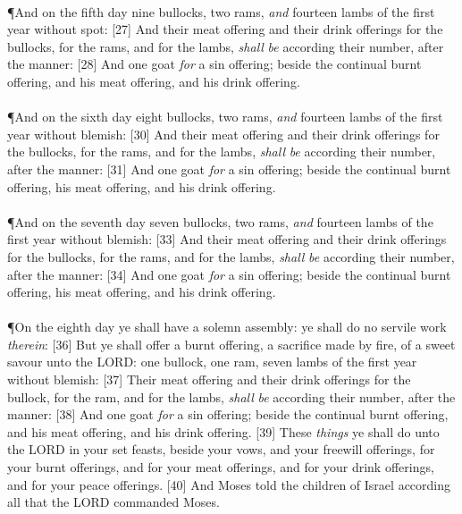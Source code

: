 \\
\P \textcolor[cmyk]{0.99998,1,0,0}{And on the fifth day nine bullocks, two rams, \emph{and} fourteen lambs of the first year without spot:}
[27] \textcolor[cmyk]{0.99998,1,0,0}{And their meat offering and their drink offerings for the bullocks, for the rams, and for the lambs, \emph{shall} \emph{be} according  their number, after the manner:}
[28] \textcolor[cmyk]{0.99998,1,0,0}{And one goat \emph{for} a sin offering; beside the continual burnt offering, and his meat offering, and his drink offering.}\\
\\
\P \textcolor[cmyk]{0.99998,1,0,0}{And on the sixth day eight bullocks, two rams, \emph{and} fourteen lambs of the first year without blemish:}
[30] \textcolor[cmyk]{0.99998,1,0,0}{And their meat offering and their drink offerings for the bullocks, for the rams, and for the lambs, \emph{shall} \emph{be} according  their number, after the manner:}
[31] \textcolor[cmyk]{0.99998,1,0,0}{And one goat \emph{for} a sin offering; beside the continual burnt offering, his meat offering, and his drink offering.}\\
\\
\P \textcolor[cmyk]{0.99998,1,0,0}{And on the seventh day seven bullocks, two rams, \emph{and} fourteen lambs of the first year without blemish:}
[33] \textcolor[cmyk]{0.99998,1,0,0}{And their meat offering and their drink offerings for the bullocks, for the rams, and for the lambs, \emph{shall} \emph{be} according  their number, after the manner:}
[34] \textcolor[cmyk]{0.99998,1,0,0}{And one goat \emph{for} a sin offering; beside the continual burnt offering, his meat offering, and his drink offering.}\\
\\
\P \textcolor[cmyk]{0.99998,1,0,0}{On the eighth day ye shall have a solemn assembly: ye shall do no servile work \emph{therein}:}
[36] \textcolor[cmyk]{0.99998,1,0,0}{But ye shall offer a burnt offering, a sacrifice made by fire, of a sweet savour unto the LORD: one bullock, one ram, seven lambs of the first year without blemish:}
[37] \textcolor[cmyk]{0.99998,1,0,0}{Their meat offering and their drink offerings for the bullock, for the ram, and for the lambs, \emph{shall} \emph{be} according  their number, after the manner:}
[38] \textcolor[cmyk]{0.99998,1,0,0}{And one goat \emph{for} a sin offering; beside the continual burnt offering, and his meat offering, and his drink offering.}
[39] \textcolor[cmyk]{0.99998,1,0,0}{These \emph{things} ye shall do unto the LORD in your set feasts, beside your vows, and your freewill offerings, for your burnt offerings, and for your meat offerings, and for your drink offerings, and for your peace offerings.}
[40] \textcolor[cmyk]{0.99998,1,0,0}{And Moses told the children of Israel according  all that the LORD commanded Moses.}